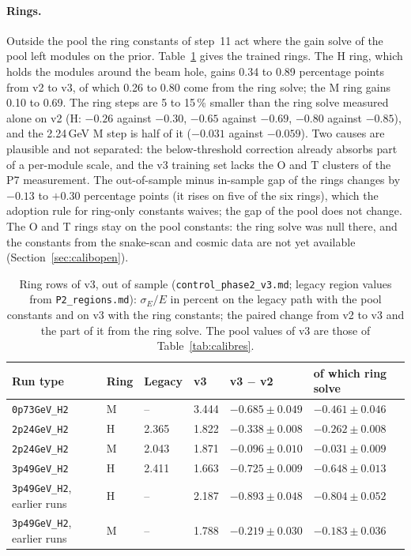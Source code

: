 \documentclass[11pt]{article}
\newcommand{\code}[1]{\texttt{#1}}
\begin{document}
\paragraph{Rings.} Outside the pool the ring constants of step~11 act where the gain solve of the pool left modules on the prior. Table~\ref{tab:calibrings} gives the trained rings. The H ring, which holds the modules around the beam hole, gains 0.34 to 0.89 percentage points from v2 to v3, of which 0.26 to 0.80 come from the ring solve; the M ring gains 0.10 to 0.69. The ring steps are 5 to 15\,\% smaller than the ring solve measured alone on v2 (H: $-0.26$ against $-0.30$, $-0.65$ against $-0.69$, $-0.80$ against $-0.85$), and the 2.24\,GeV M step is half of it ($-0.031$ against $-0.059$). Two causes are plausible and not separated: the below-threshold correction already absorbs part of a per-module scale, and the v3 training set lacks the O and T clusters of the P7 measurement. The out-of-sample minus in-sample gap of the rings changes by $-0.13$ to $+0.30$ percentage points (it rises on five of the six rings), which the adoption rule for ring-only constants waives; the gap of the pool does not change. The O and T rings stay on the pool constants: the ring solve was null there, and the constants from the snake-scan and cosmic data are not yet available (Section~\ref{sec:calibopen}).

\begin{table}[htbp]
\centering
\caption{Ring rows of v3, out of sample (\code{control\_phase2\_v3.md}; legacy region values from \code{P2\_regions.md}): $\sigma_E/E$ in percent on the legacy path with the pool constants and on v3 with the ring constants; the paired change from v2 to v3 and the part of it from the ring solve. The pool values of v3 are those of Table~\ref{tab:calibres}.}
\label{tab:calibrings}
\small
\begin{tabular}{llllll}
\toprule
Run type & Ring & Legacy & v3 & v3 $-$ v2 & of which ring solve \\
\midrule
\code{0p73GeV\_H2} & M & -- & 3.444 & $-0.685 \pm 0.049$ & $-0.461 \pm 0.046$ \\
\code{2p24GeV\_H2} & H & 2.365 & 1.822 & $-0.338 \pm 0.008$ & $-0.262 \pm 0.008$ \\
\code{2p24GeV\_H2} & M & 2.043 & 1.871 & $-0.096 \pm 0.010$ & $-0.031 \pm 0.009$ \\
\code{3p49GeV\_H2} & H & 2.411 & 1.663 & $-0.725 \pm 0.009$ & $-0.648 \pm 0.013$ \\
\code{3p49GeV\_H2}, earlier runs & H & -- & 2.187 & $-0.893 \pm 0.048$ & $-0.804 \pm 0.052$ \\
\code{3p49GeV\_H2}, earlier runs & M & -- & 1.788 & $-0.219 \pm 0.030$ & $-0.183 \pm 0.036$ \\
\bottomrule
\end{tabular}
\end{table}
\end{document}
